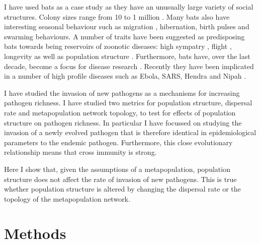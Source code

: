 I have used bats as a case study as they have an unusually large variety of social structures.
Colony sizes range from 10 to 1 million \cite{jones2009pantheria}.
Many bats also have interesting seasonal behaviour such as migration \cite{richter2008first, fleming2003ecology}, hibernation, birth pulses and swarming behaviours.
A number of traits have been suggested as predisposing bats towards being reservoirs of zoonotic diseases: high sympatry \cite{luis2013comparison}, flight \cite{wang2011mass}, longevity \cite{wang2011mass} as well as population structure \cite{maganga2014bat, turmelle2009correlates, gay2014parasite}.
Furthermore, bats have, over the last decade, become a focus for disease research  \cite{calisher2006bats, hughes2007emerging}.
Recently they have been implicated in a number of high profile diseases such as Ebola, SARS, Hendra and Nipah  \cite{calisher2006bats, li2005bats}.





I have studied the invasion of new pathogens as a mechanisms for increasing pathogen richness.
I have studied two metrics for population structure, dispersal rate and metapopulation network topology, to test for effects of population structure on pathogen richness.
In particular I have focussed on studying the invasion of a newly evolved pathogen that is therefore identical in epidemiological parameters to the endemic pathogen.
Furthermore, this close evolutionary relationship means that cross immunity is strong.


Here I show that, given the assumptions of a metapopulation, population structure does not affect the rate of invasion of new pathogens.
This is true whether population structure is altered by changing the dispersal rate or the topology of the metapopulation network.






\section{Methods}

